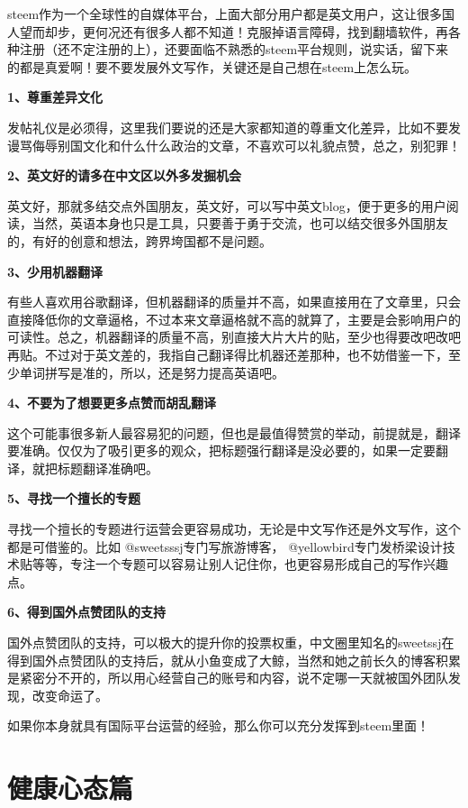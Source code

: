 \documentclass[]{ctexbook}
\begin{document}
steem作为一个全球性的自媒体平台，上面大部分用户都是英文用户，这让很多国人望而却步，更何况还有很多人都不知道！克服掉语言障碍，找到翻墙软件，再各种注册（还不定注册的上），还要面临不熟悉的steem平台规则，说实话，留下来的都是真爱啊！要不要发展外文写作，关键还是自己想在steem上怎么玩。

\textbf{1、尊重差异文化}

发帖礼仪是必须得，这里我们要说的还是大家都知道的尊重文化差异，比如不要发谩骂侮辱别国文化和什么什么政治的文章，不喜欢可以礼貌点赞，总之，别犯罪！

\textbf{2、英文好的请多在中文区以外多发掘机会}

英文好，那就多结交点外国朋友，英文好，可以写中英文blog，便于更多的用户阅读，当然，英语本身也只是工具，只要善于勇于交流，也可以结交很多外国朋友的，有好的创意和想法，跨界垮国都不是问题。

\textbf{3、少用机器翻译}

有些人喜欢用谷歌翻译，但机器翻译的质量并不高，如果直接用在了文章里，只会直接降低你的文章逼格，不过本来文章逼格就不高的就算了，主要是会影响用户的可读性。总之，机器翻译的质量不高，别直接大片大片的贴，至少也得要改吧改吧再贴。不过对于英文差的，我指自己翻译得比机器还差那种，也不妨借鉴一下，至少单词拼写是准的，所以，还是努力提高英语吧。

\textbf{4、不要为了想要更多点赞而胡乱翻译}

这个可能事很多新人最容易犯的问题，但也是最值得赞赏的举动，前提就是，翻译要准确。仅仅为了吸引更多的观众，把标题强行翻译是没必要的，如果一定要翻译，就把标题翻译准确吧。

\textbf{5、寻找一个擅长的专题}

寻找一个擅长的专题进行运营会更容易成功，无论是中文写作还是外文写作，这个都是可借鉴的。比如 @sweetsssj专门写旅游博客， @yellowbird专门发桥梁设计技术贴等等，专注一个专题可以容易让别人记住你，也更容易形成自己的写作兴趣点。

\textbf{6、得到国外点赞团队的支持}

国外点赞团队的支持，可以极大的提升你的投票权重，中文圈里知名的sweetssj在得到国外点赞团队的支持后，就从小鱼变成了大鲸，当然和她之前长久的博客积累是紧密分不开的，所以用心经营自己的账号和内容，说不定哪一天就被国外团队发现，改变命运了。

如果你本身就具有国际平台运营的经验，那么你可以充分发挥到steem里面！

\section{健康心态篇}
\end{document}
